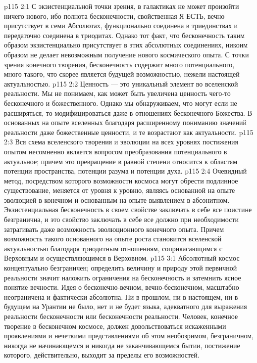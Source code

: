 \vs p115 2:1 С экзистенциальной точки зрения, в галактиках не может произойти ничего нового, ибо полнота бесконечности, свойственная Я ЕСТЬ, вечно присутствует в семи Абсолютах, функционально соединена в триединствах и передаточно соединена в триодитах. Однако тот факт, что бесконечность таким образом экзистенциально присутствует в этих абсолютных соединениях, никоим образом не делает невозможным получение нового космического опыта. С точки зрения конечного творения, бесконечность содержит много потенциального, много такого, что скорее является будущей возможностью, нежели настоящей актуальностью.
\vs p115 2:2 Ценность --- это уникальный элемент во вселенской реальности. Мы не понимаем, как может быть увеличена ценность чего\hyp{}то бесконечного и божественного. Однако мы обнаруживаем, что  могут если не расширяться, то модифицироваться даже в отношениях бесконечного Божества. В основанных на опыте вселенных благодаря расширенному пониманию значений реальности даже божественные ценности, и те возрастают как актуальности.
\vs p115 2:3 Вся схема вселенского творения и эволюции на всех уровнях постижения опытом несомненно является вопросом преобразования потенциального в актуальное; причем это превращение в равной степени относится к областям потенции пространства, потенции разума и потенции духа.
\vs p115 2:4 Очевидный метод, посредством которого возможности космоса могут обрести подлинное существование, меняется от уровня к уровню, являясь основанной на опыте эволюцией в конечном и основанным на опыте выявлением в абсонитном. Экзистенциальная бесконечность в своем свойстве заключать в себе все поистине безгранична, и это свойство заключать в себе все должно при необходимости затрагивать даже возможность эволюционного конечного опыта. Причем возможность такого основанного на опыте роста становится вселенской актуальностью благодаря триодитным отношениям, соприкасающимся с Верховным и осуществляющимся в Верховном.
\vs p115 3:1 Абсолютный космос концептуально безграничен; определить величину и природу этой первичной реальности значит наложить ограничения на бесконечность и затемнить ясное понятие вечности. Идея о бесконечно\hyp{}вечном, вечно\hyp{}бесконечном, масштабно неограничена и фактически абсолютна. Ни в прошлом, ни в настоящем, ни в будущем на Урантии не было, нет и не будет языка, адекватного для выражения реальности бесконечности или бесконечности реальности. Человек, конечное творение в бесконечном космосе, должен довольствоваться искаженными проявлениями и нечеткими представлениями об этом необозримом, безграничном, никогда не начинающемся и никогда не заканчивающемся бытии, постижение которого, действительно, выходит за пределы его возможностей.

